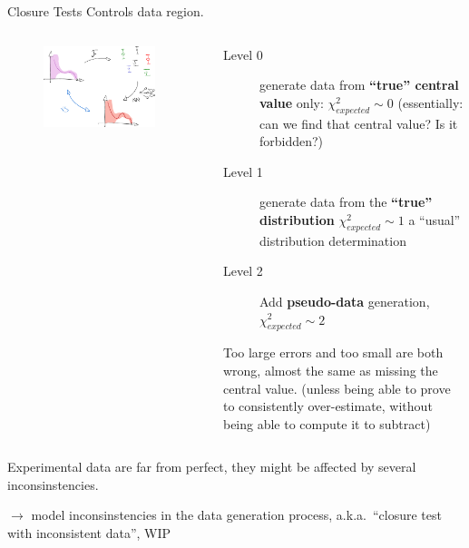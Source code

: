 \documentclass[9pt]{beamer}
\begin{document}
\begin{frame}{Closure Tests}
    Controls data region.
    \begin{columns}
        \begin{column}{0.5\textwidth}
            \begin{figure}
                \hspace*{20pt}
                \includegraphics[width=0.9\textwidth]{closure-tests}
            \end{figure}
        \end{column}
        \begin{column}{0.5\textwidth}
            \begin{description}
                \item[Level 0] generate data from \textbf{\enquote{true}
                    central value} only: $\chi^2_{expected} \sim 0$
                    {\footnotesize (essentially: can we find that central
                    value? Is it forbidden?)}
                \item[Level 1] generate data from the \textbf{\enquote{true}
                    distribution} $\chi^2_{expected} \sim 1$
                    {\footnotesize a \enquote{usual} distribution
                    determination}
                \item[Level 2] Add \textbf{pseudo-data} generation,
                    $\chi^2_{expected} \sim 2$
            \end{description}
            \vspace*{20pt}
            
            Too large errors and too small are both wrong, almost the same as
            missing the central value.
            {\footnotesize (unless being able to prove to consistently
            over-estimate, without being able to compute it to subtract)}
        \end{column}
    \end{columns}
    \vspace*{20pt}

    Experimental data are far from perfect, they might be affected by several
    inconsinstencies.
    \begin{flushright}
        $\to$ model inconsinstencies in the data generation process, a.k.a.\
        \enquote{closure test with inconsistent data}, WIP
    \end{flushright}
\end{frame}
\end{document}
